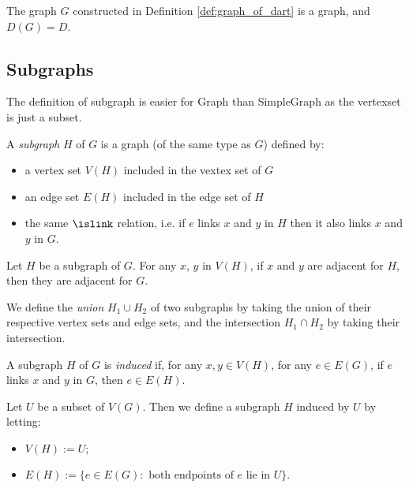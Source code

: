 \begin{theorem}
  \label{thm:dart_of_graph_of_dart}
  The graph $G$ constructed in Definition \ref{def:graph_of_dart} is a graph,
  and $D(G) = D$.
\end{theorem}

\subsection{Subgraphs}

The definition of subgraph is easier for Graph than SimpleGraph as the vertexset is just a subset.

\begin{definition}
  \label{def:subgraph}
  A \emph{subgraph} $H$ of $G$ is a graph (of the same type as $G$) defined by:
  \begin{itemize}
    \item a vertex set $V(H)$ included in the vextex set of $G$
    \item an edge set $E(H)$ included in the edge set of $H$
    \item the same $\islink$ relation, i.e. if $e$ links $x$ and $y$ in $H$ then it
    also links $x$ and $y$ in $G$.
  \end{itemize}
\end{definition}

\begin{lemma}
  \label{lem:subgraph_adj_graph}
  Let $H$ be a subgraph of $G$.
  For any $x$, $y$ in $V(H)$, if $x$ and $y$ are adjacent for $H$, then they are
  adjacent for $G$.
\end{lemma}

\begin{definition}
  \label{def:max_subgraph,def:min_subgraph}
  We define the \emph{union} $H_1 \cup H_2$ of two subgraphs by taking the union of
  their respective vertex sets and edge sets,
  and the intersection $H_1 \cap H_2$ by taking their intersection.
\end{definition}

\begin{definition}
  \label{def:isinduced}
  A subgraph $H$ of $G$ is \emph{induced} if, for any $x, y \in V(H)$, for any $e \in E(G)$,
  if $e$ links $x$ and $y$ in $G$, then $e \in E(H)$.
\end{definition}

\begin{definition}
  \label{def:induced_subgraph}
  Let $U$ be a subset of $V(G)$. Then we define a subgraph $H$ induced by $U$ by letting:
  \begin{itemize}
    \item $V(H) := U$;
    \item $E(H) := \{ e \in E(G) : \text{ both endpoints of }e \text{ lie in } U\}$.
  \end{itemize}
\end{definition}

